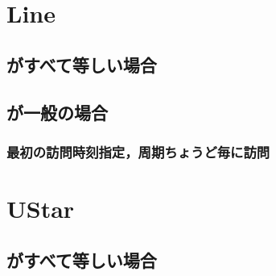 \section{Line}


\subsection{{\timelimit}がすべて等しい場合}


\begin{frame}{}
	
\end{frame}




\subsection{{\timelimit}が一般の場合}


\begin{frame}{}
	
\end{frame}




\subsubsection{最初の訪問時刻指定，周期ちょうど毎に訪問}


\begin{frame}{}
	
\end{frame}






\section{UStar}



\begin{frame}{}
	
\end{frame}





\subsection{{\timelimit}がすべて等しい場合}



\begin{frame}{}
	
\end{frame}




